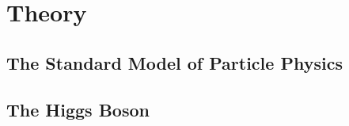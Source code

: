 \chapter{Theory}\label{cha:theory}

\section{The Standard Model of Particle Physics}\label{sec:the_standard_model_of_particle_physics}

\section{The Higgs Boson}\label{sec:the_higgs_boson}
